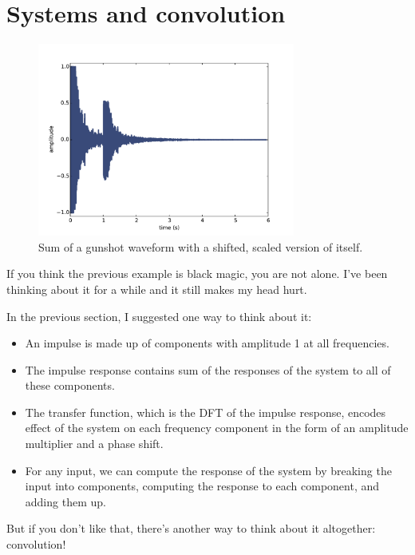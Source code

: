 \documentclass[12pt]{book}
\begin{document}
\section{Systems and convolution}

\begin{figure}
\centerline{\includegraphics[height=2.5in]{figs/systems8.pdf}}
\caption{Sum of a gunshot waveform with a shifted, scaled version of
itself.}
\label{fig.systems8}
\end{figure}

If you think the previous example is black magic,
you are not alone.  I've been thinking about it for a while and it
still makes my head hurt.

In the previous section, I suggested one way to think about it:

\begin{itemize}

\item An impulse is made up of components with amplitude 1 at all
  frequencies.

\item The impulse response contains sum of the responses of the
  system to all of these components.

\item The transfer function, which is the DFT of the impulse response,
  encodes effect of the system on each frequency component in the form
  of an amplitude multiplier and a phase shift.

\item For any input, we can compute the response of the system
  by breaking the input into components, computing the response to
  each component, and adding them up.

\end{itemize}

But if you don't like that, there's another way to think about
it altogether: convolution!
\end{document}
